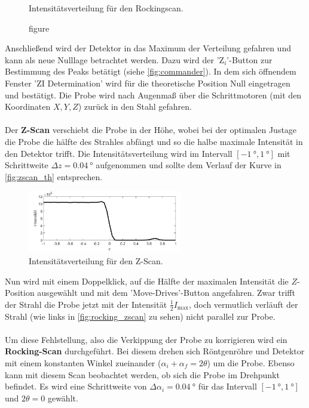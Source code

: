 \begin{figure}[ht]
\begin{minipage}[b]{0.45\linewidth}
      \caption{figure}{Intensitätsverteilung für den Rockingscan.\cite[6]{anleitung}}
      \label{fig:rockingscan_th}
    \end{minipage}
\end{figure}
Anschließend wird der Detektor in das Maximum der Verteilung gefahren und kann als neue Nulllage betrachtet werden.
Dazu wird der '$\mathrm{Z}_i$'-Button zur Bestimmung des Peaks betätigt (siehe \autoref{fig:commander}).
In dem sich öffnendem Fenster 'ZI Determination' wird für die theoretische Position Null eingetragen und bestätigt.
Die Probe wird nach Augenmaß über die Schrittmotoren (mit den Koordinaten $X, Y, Z$) zurück in den Stahl gefahren.
\\
\\
Der \textbf{Z-Scan} verschiebt die Probe in der Höhe, wobei bei der optimalen Justage die Probe die hälfte des Strahles abfängt und so die halbe maximale Intensität in den Detektor trifft.
Die Intensitätsverteilung wird im Intervall $[\SI{-1}{\degree}, \SI{1}{\degree}]$ mit Schrittweite $\Delta z = \SI{0.04}{\degree}$ aufgenommen und sollte dem Verlauf der Kurve in \autoref{fig:zscan_th} entsprechen.
\begin{figure}
    \centering
    \includegraphics[width=0.6\textwidth]{content/data/zscan.jpg}
    \caption{Intensitätsverteilung für den Z-Scan.\cite[6]{anleitung}}
    \label{fig:zscan_th}
\end{figure}
Nun wird mit einem Doppelklick, auf die Hälfte der maximalen Intensität die $Z$-Position ausgewählt und mit dem 'Move-Drives'-Button angefahren.
Zwar trifft der Strahl die Probe jetzt mit der Intensität $\frac{1}{2}I_\text{max}$, doch vermutlich verläuft der Strahl (wie links in \autoref{fig:rocking_zscan} zu sehen) nicht parallel zur Probe.
\\
\\
Um diese Fehlstellung, also die Verkippung der Probe zu korrigieren wird ein \textbf{Rocking-Scan} durchgeführt.
Bei diesem drehen sich Röntgenröhre und Detektor mit einem konstanten Winkel zueinander ($\alpha_i + \alpha_f = 2 \theta$) um die Probe.
Ebenso kann mit diesem Scan beobachtet werden, ob sich die Probe im Drehpunkt befindet.
Es wird eine Schrittweite von $\Delta \alpha_i = \SI{0.04}{\degree}$ für das Intervall $[\SI{-1}{\degree}, \SI{1}{\degree}]$ und $2 \theta = 0$ gewählt.
